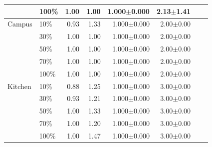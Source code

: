 \begin{table}[t]
\begin{tabular}{llrrrrrr}
 & 100\% & 1.00 & 1.00 & 1.000$\pm$0.000 & 2.13$\pm$1.41 \\
\midrule
Campus & 10\% & 0.93 & 1.33 & 1.000$\pm$0.000 & 2.00$\pm$0.00 \\
 & 30\% & 1.00 & 1.00 & 1.000$\pm$0.000 & 2.00$\pm$0.00 \\
 & 50\% & 1.00 & 1.00 & 1.000$\pm$0.000 & 2.00$\pm$0.00 \\
 & 70\% & 1.00 & 1.00 & 1.000$\pm$0.000 & 2.00$\pm$0.00 \\
 & 100\% & 1.00 & 1.00 & 1.000$\pm$0.000 & 2.00$\pm$0.00 \\
\midrule
Kitchen & 10\% & 0.88 & 1.25 & 1.000$\pm$0.000 & 3.00$\pm$0.00 \\
 & 30\% & 0.93 & 1.21 & 1.000$\pm$0.000 & 3.00$\pm$0.00 \\
 & 50\% & 1.00 & 1.33 & 1.000$\pm$0.000 & 3.00$\pm$0.00 \\
 & 70\% & 1.00 & 1.20 & 1.000$\pm$0.000 & 3.00$\pm$0.00 \\
 & 100\% & 1.00 & 1.47 & 1.000$\pm$0.000 & 3.00$\pm$0.00 \\
\midrule
\bottomrule
\end{tabular}
\end{table}